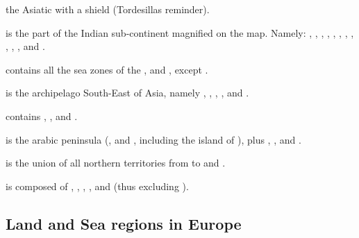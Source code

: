 \begin{deflist}
  the Asiatic \Areas with a  shield (Tordesillas
  reminder).
\item[\anchorcontinent{India}] is the part of the Indian sub-continent
  magnified on the map. Namely: \granderegionDelhi, \granderegionAoudh,
  \granderegionBengale, \granderegionGujarat, \granderegionPendjab,
  \granderegionIndus, \granderegionOrissa, \granderegionGondwana,
  \granderegionMumbai, \granderegionHyderabad, \granderegionMalabar,
  \granderegionKarnatika and .
\item[\anchorregion{Indian}] contains all the sea zones of the ,
   and , except \seazoneTempetes.
\item[\anchorcontinent{Indonesia}] is the archipelago South-East of Asia,
  namely , , ,
  ,  and .
\item[\anchorcontinent{Indochina}] contains \granderegionBirmanie,
  \granderegionMalacca, \granderegionAyutthaya and .
\item[\anchorcontinent{Middle East}] is the arabic peninsula
  (\granderegionNedj, \granderegionOman and \granderegionAden, including the
  island of \provinceSocotra), plus \provinceOrmus,
  ,  and
  .
\item[\anchorcontinent{Siberia}] is the union of all northern territories from
   to  and .
\item[\anchorcontinent{Asia}] is composed of ,
  \continentIndia, \continentIndochina, ,
  \continentIndonesia and \granderegionOceania (thus excluding
  \continentSiberia).
\end{deflist}



\subsection{Land and Sea regions in Europe}

